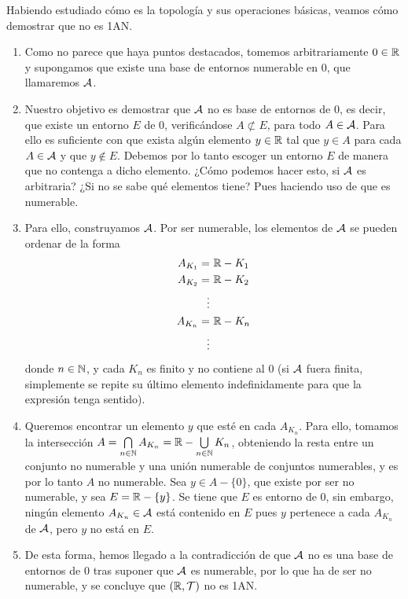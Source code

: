 \begin{ej}
\begin{enumerate}[label=--, topsep=0pt, itemsep=0pt]
    \end{enumerate}

    \smallskip

    Habiendo estudiado cómo es la topología y sus operaciones básicas, veamos cómo demostrar que no es 1AN.

    \begin{enumerate}[itemsep=0pt, topsep=0pt, label=--]
        \item Como no parece que haya puntos destacados, tomemos arbitrariamente $0\in\mathbb{R}$ y supongamos que existe una base de entornos numerable en $0$, que llamaremos $\mathcal{A}$.
        \item Nuestro objetivo es demostrar que $\mathcal{A}$ no es base de entornos de $0$, es decir, que existe un entorno $E$ de $0$, verificándose $A\not\subset E$, para todo $A\in\mathcal{A}$. Para ello es suficiente con que exista algún elemento $y\in\mathbb{R}$ tal que $y\in A$ para cada $A\in\mathcal{A}$ y que $y\notin E$. Debemos por lo tanto escoger un entorno $E$ de manera que no contenga a dicho elemento. ¿Cómo podemos hacer esto, si $\mathcal{A}$ es arbitraria? ¿Si no se sabe qué elementos tiene? Pues haciendo uso de que es numerable.
        \item Para ello, construyamos $\mathcal{A}$. Por ser numerable, los elementos de $\mathcal{A}$ se pueden ordenar de la forma
        \vspace{-1em}
        \begin{align*}
            A_{K_1} = & \ \mathbb{R} - K_1\\
            A_{K_2} = & \ \mathbb{R} - K_2\\
            \vdots&\\
            A_{K_n} = & \ \mathbb{R} - K_n\\
            \vdots&
        \end{align*}
        donde $n\in\mathbb{N}$, y cada $K_n$ es finito y no contiene al $0$ (si $\mathcal{A}$ fuera finita, simplemente se repite su último elemento indefinidamente para que la expresión tenga sentido).
        \item Queremos encontrar un elemento $y$ que esté en cada $A_{K_n}$. Para ello, tomamos la intersección $A = \bigcap\limits_{n\in\mathbb{N}} A_{K_n} = \mathbb{R} - \bigcup\limits_{n\in\mathbb{N}}K_n$, obteniendo la resta entre un conjunto no numerable y una unión numerable de conjuntos numerables, y es por lo tanto $A$ no numerable. Sea $y\in A - \{0\}$, que existe por ser no numerable, y sea $E = \mathbb{R} - \{y\}$. Se tiene que $E$ es entorno de $0$, sin embargo, ningún elemento $A_{K_n}\in\mathcal{A}$ está contenido en $E$ pues $y$ pertenece a cada $A_{K_n}$ de $\mathcal{A}$, pero $y$ no está en $E$.
        \item De esta forma, hemos llegado a la contradicción de que $\mathcal{A}$ no es una base de entornos de $0$ tras suponer que $\mathcal{A}$ es numerable, por lo que ha de ser no numerable, y se concluye que $(\mathbb{R}, \mathcal{T})$ no es 1AN.
    \end{enumerate}
\end{ej}

